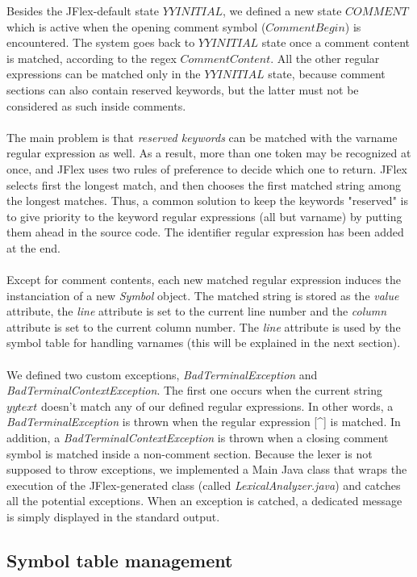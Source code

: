 \documentclass[12pt]{report}
\begin{document}
Besides the JFlex-default state $YYINITIAL$, we defined a new state $COMMENT$ which is active when the opening comment symbol ($CommentBegin$) is encountered. The system goes back to $YYINITIAL$ state once a comment content is matched, according to the regex $CommentContent$.
All the other regular expressions can be matched only in the $YYINITIAL$ state, because comment sections can also contain reserved keywords, but the latter
must not be considered as such inside comments. \\ \\
The main problem is that \textit{reserved keywords} can be matched with the varname regular expression as well. As a result, more than one token may be recognized at once, and JFlex uses two rules of preference to decide which one to return. JFlex selects first the longest match, and then chooses the first matched string among the longest matches. Thus, a common solution to keep the keywords "reserved" is to give priority to the keyword regular expressions (all but varname) by putting them ahead in the source code. The identifier regular expression has been added at the end. \\ \\
Except for comment contents, each new matched regular expression induces the instanciation of a new \textit{Symbol} object.
The matched string is stored as the \textit{value} attribute, the \textit{line} attribute is set to the current line number and the \textit{column} attribute is set
to the current column number. The \textit{line} attribute is used by the symbol table for handling varnames (this will be explained in the next section). \\ \\
We defined two custom exceptions, \textit{BadTerminalException} and \textit{BadTerminalContextException}. The first one occurs when the current string
$yytext$ doesn't match any of our defined regular expressions. In other words, a \textit{BadTerminalException} is thrown when the regular expression
[\textasciicircum] is matched. In addition, a \textit{BadTerminalContextException} is thrown when a closing comment symbol is matched inside a non-comment section. Because the lexer is not supposed to throw exceptions, we implemented a Main Java class that wraps the execution of the JFlex-generated class (called \textit{LexicalAnalyzer.java}) and catches all the potential exceptions. When an exception is catched, a dedicated message is simply displayed in the standard output.

\subsection{Symbol table management}
\end{document}
